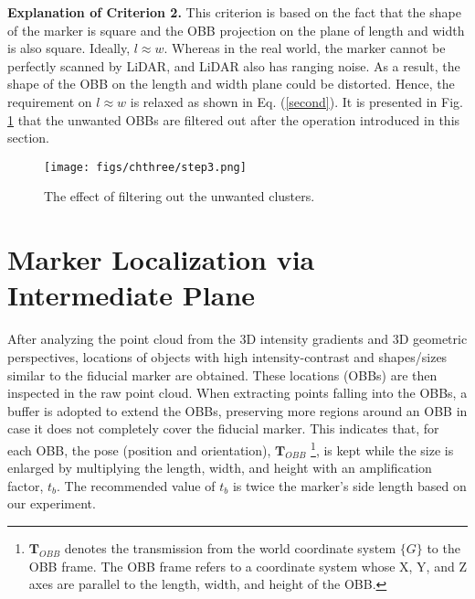 \noindent\textbf{Explanation of Criterion 2.} This criterion is based on the fact that the shape of the marker is square and the OBB projection on the plane of length and width is also square. Ideally, $l \approx w$. Whereas in the real world, the marker cannot be perfectly scanned by LiDAR, and LiDAR also has ranging noise. 
As a result, the shape of the OBB on the length and width plane could be distorted. Hence, the requirement on $l \approx w$ is relaxed as shown in Eq. (\ref{second}). It is presented in Fig. \ref{step3} that the unwanted OBBs are filtered out after the operation introduced in this section.
\begin{figure}[H] 
	\centering
\texttt{[image: figs/chthree/step3.png]}
	\caption{The effect of filtering out the unwanted clusters.}
	\label{step3}
\end{figure} \par

\section{Marker Localization via Intermediate Plane} \label{4.3}
After analyzing the point cloud from the 3D intensity gradients and 3D geometric perspectives, locations of objects with high intensity-contrast and shapes/sizes similar to the fiducial marker are obtained. 
%
These locations (OBBs) are then inspected in the raw point cloud. When extracting points falling into the OBBs, a buffer is adopted to extend the OBBs, preserving more regions around an OBB in case it does not completely cover the fiducial marker. This indicates that, for each OBB, the pose (position and orientation), $\mathbf{T}_{OBB}$ \footnote{$\mathbf{T}_{OBB}$ denotes the transmission from the world coordinate system $\{G\}$ to the OBB frame. The OBB frame refers to a coordinate system whose X, Y, and Z axes are parallel to the length, width, and height of the OBB. }, is kept while the size is enlarged by multiplying the length, width, and height with an amplification factor, $t_{b}$. The recommended value of $t_{b}$ is twice the marker's side length based on our experiment. \par
